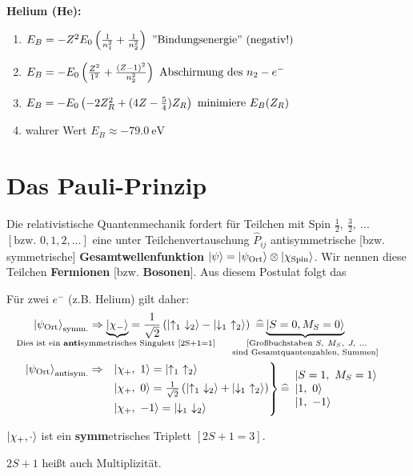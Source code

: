 \documentclass[Ex4_Zusammenfassung.tex]{subfiles}
\begin{document}
\textbf{Helium (He):}
\begin{enumerate}
	\item $E_B = - Z^2 E_0 \left( \frac{1}{n_1^2} + \frac{1}{n_2^2} \right) \ \text{''Bindungsenergie'' (negativ!)}$
	\item $E_B = - E_0 \left( \frac{Z^2}{1^2} + \frac{(Z-1)^2}{n_2^2} \right)\ \text{Abschirmung des } n_2-e^-$
	\item $E_B = -E_0 \left(-2Z_R^2 + (4Z - \frac{5}{4}) Z_R \right)\ \text{minimiere } E_B(Z_R) $
	\item wahrer Wert $ E_B \approx \SI{-79.0}{\eV}$
\end{enumerate}

\section{Das Pauli-Prinzip}
Die relativistische Quantenmechanik fordert für Teilchen mit Spin $\frac{1}{2},\ \frac{3}{2},\ ... $ $\left[\text{bzw. } 0, 1, 2, ... \right]$ eine unter Teilchenvertauschung $\hat{P}_{ij} $ antisymmetrische [bzw. symmetrische] \textbf{Gesamtwellenfunktion} $ \ket{\psi} = \ket{\psi_{\text{Ort}}} \otimes \ket{\chi_{\text{Spin}}} $. Wir nennen diese Teilchen \textbf{Fermionen} [bzw. \textbf{Bosonen}]. Aus diesem Postulat folgt das



Für zwei $e^-$ (z.B. Helium) gilt daher:
\begin{align*}
	\ket{\psi_{\text{Ort}}}_{\text{symm.}} &\Rightarrow \underbrace{\ket{\chi_-}}_{\mathclap{\text{Dies ist ein \textbf{anti}symmetrisches Singulett [2S+1=1] }}} = \frac{1}{\sqrt{2}} \lp \ket{\uparrow_1\ \downarrow_2} - \ket{\downarrow_1\ \uparrow_2} \rp\  \widehat{=} \underbrace{\ket{S=0, M_S=0}}_{\mathclap{\substack{\text{ [Großbuchstaben } S,\ M_S,\ J,\ ... \\ \text{ sind Gesamtquantenzahlen, Summen] } }} }\\
	& \kern -5.95em \begin{rcases}
		\ket{\psi_{\text{Ort}}}_{\text{antisym.}} \Rightarrow &\ket{\chi_+ ,\ 1} = \ket{\uparrow_1\ \uparrow_2} \\
		&\ket{\chi_+ ,\ 0} = \frac{1}{\sqrt{2}} \lp \ket{\uparrow_1\ \downarrow_2} + \ket{\downarrow_1\ \uparrow_2} \rp\\
		&\ket{\chi_+ ,\ -1} = \ket{\downarrow_1\ \downarrow_2}
	\end{rcases} 
	\widehat{=} 
		\begin{array}{l}
			\ket{S=1,\ M_S=1}\\
			\ket{1,\ 0}\\
			\ket{1,\ -1}
		\end{array}
\end{align*}

$\ket{\chi_+,\cdot}$ ist ein \textbf{symm}etrisches Triplett $\left[2S+1 =3\right]$.

$2S+1$ heißt auch Multiplizität.
\end{document}
